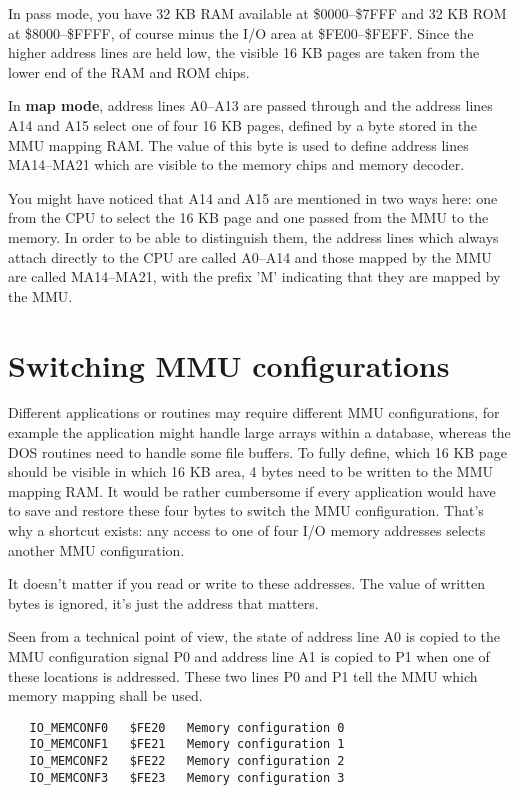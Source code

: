 In pass mode, you have 32 KB RAM available at \$0000--\$7FFF and
32 KB ROM at \$8000--\$FFFF, of course minus the I/O area at
\$FE00--\$FEFF. Since the higher address lines are held low, the
visible 16 KB pages are taken from the lower end of the RAM and
ROM chips.

In {\bf map mode}, address lines A0--A13 are passed through and
the address lines A14 and A15 select one of four 16 KB pages,
defined by a byte stored in the MMU mapping RAM. The value of
this byte is used to define address lines MA14--MA21 which are
visible to the memory chips and memory decoder.

You might have noticed that A14 and A15 are mentioned in two
ways here: one from the CPU to select the 16 KB page and one
passed from the MMU to the memory. In order to be able to
distinguish them, the address lines which always attach directly
to the CPU are called A0--A14 and those mapped by the MMU are
called MA14--MA21, with the prefix 'M' indicating that they are
mapped by the MMU.

\section{Switching MMU configurations}
Different applications or routines may require different MMU
configurations, for example the application might handle large
arrays within a database, whereas the DOS routines need to
handle some file buffers. To fully define, which 16 KB page
should be visible in which 16 KB area, 4 bytes need to be
written to the MMU mapping RAM. It would be rather cumbersome if
every application would have to save and restore these four
bytes to switch the MMU configuration. That's why a shortcut
exists: any access to one of four I/O memory addresses selects
another MMU configuration.

It doesn't matter if you read or write to these addresses. The
value of written bytes is ignored, it's just the address that
matters.

Seen from a technical point of view, the state of address line
A0 is copied to the MMU configuration signal P0 and address line
A1 is copied to P1 when one of these locations is addressed.
These two lines P0 and P1 tell the MMU which memory mapping
shall be used.

\begin{verbatim}
   IO_MEMCONF0   $FE20   Memory configuration 0
   IO_MEMCONF1   $FE21   Memory configuration 1
   IO_MEMCONF2   $FE22   Memory configuration 2
   IO_MEMCONF3   $FE23   Memory configuration 3
\end{verbatim}


